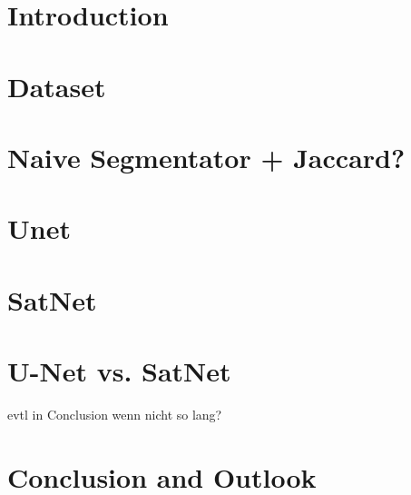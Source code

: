 \documentclass[twoside,12pt]{report}
\begin{document}



\newpage
\thispagestyle{empty}\null\newpage



\tableofcontents

\thispagestyle{empty}\null\newpage

\chapter{Introduction}

\chapter{Dataset}

\chapter{Naive Segmentator + Jaccard?}

\chapter{Unet}


\clearpage

\chapter{SatNet}

\chapter{U-Net vs. SatNet}
evtl in Conclusion wenn nicht so lang?
\chapter{Conclusion and Outlook}


% 
\end{document}
